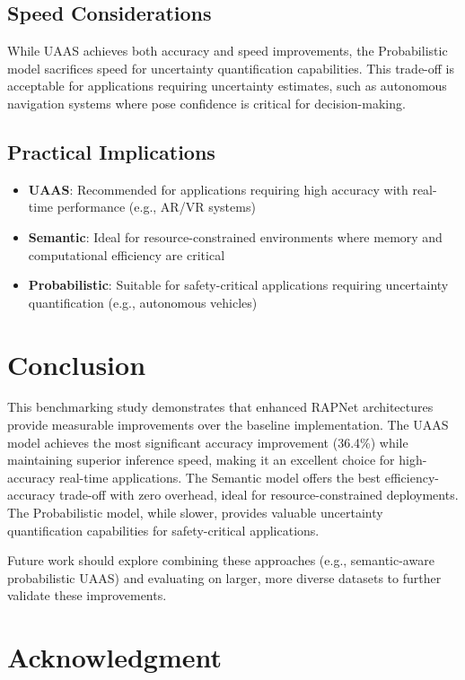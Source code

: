 \documentclass[conference]{IEEEtran}
\begin{document}
\subsection{Speed Considerations}

While UAAS achieves both accuracy and speed improvements, the Probabilistic model sacrifices speed for uncertainty quantification capabilities. This trade-off is acceptable for applications requiring uncertainty estimates, such as autonomous navigation systems where pose confidence is critical for decision-making.

\subsection{Practical Implications}

\begin{itemize}
    \item \textbf{UAAS}: Recommended for applications requiring high accuracy with real-time performance (e.g., AR/VR systems)
    \item \textbf{Semantic}: Ideal for resource-constrained environments where memory and computational efficiency are critical
    \item \textbf{Probabilistic}: Suitable for safety-critical applications requiring uncertainty quantification (e.g., autonomous vehicles)
\end{itemize}

\section{Conclusion}

This benchmarking study demonstrates that enhanced RAPNet architectures provide measurable improvements over the baseline implementation. The UAAS model achieves the most significant accuracy improvement (36.4\%) while maintaining superior inference speed, making it an excellent choice for high-accuracy real-time applications. The Semantic model offers the best efficiency-accuracy trade-off with zero overhead, ideal for resource-constrained deployments. The Probabilistic model, while slower, provides valuable uncertainty quantification capabilities for safety-critical applications.

Future work should explore combining these approaches (e.g., semantic-aware probabilistic UAAS) and evaluating on larger, more diverse datasets to further validate these improvements.

\section*{Acknowledgment}
\end{document}
